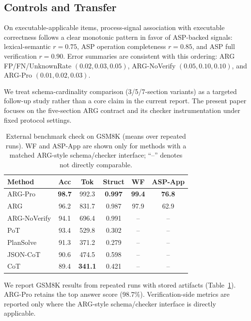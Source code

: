 \documentclass{article}
\begin{document}
\subsection{Controls and Transfer}
On executable-applicable items, process-signal association with executable correctness follows a clear monotonic pattern in favor of ASP-backed signals: lexical-semantic \(r=0.75\), ASP operation completeness \(r=0.85\), and ASP full verification \(r=0.90\). Error summaries are consistent with this ordering: ARG FP/FN/UnknownRate \((0.02,0.03,0.05)\), ARG-NoVerify \((0.05,0.10,0.10)\), and ARG-Pro \((0.01,0.02,0.03)\).

We treat schema-cardinality comparison (3/5/7-section variants) as a targeted follow-up study rather than a core claim in the current report. The present paper focuses on the five-section ARG contract and its checker instrumentation under fixed protocol settings.

\begin{table}[t]
\centering
\scriptsize
\caption{External benchmark check on GSM8K (means over repeated runs). WF and ASP-App are shown only for methods with a matched ARG-style schema/checker interface; ``--'' denotes not directly comparable.}
\label{tab:gsm8k}
\setlength{\tabcolsep}{3.5pt}
\begin{tabular}{lccccc}
\toprule
\rowcolor{headband}
Method & Acc & Tok & Struct & WF & ASP-App \\
\midrule
\rowcolor{ourband}
ARG-Pro & \textbf{98.7} & 992.3 & \textbf{0.997} & \textbf{99.4} & \textbf{76.8} \\
\rowcolor{ourband}
ARG & 96.2 & 831.7 & 0.987 & 97.9 & 62.9 \\
\rowcolor{ourband}
ARG-NoVerify & 94.1 & 696.4 & 0.991 & -- & -- \\
PoT & 93.4 & 529.8 & 0.302 & -- & -- \\
PlanSolve & 91.3 & 371.2 & 0.279 & -- & -- \\
JSON-CoT & 90.6 & 474.5 & 0.598 & -- & -- \\
CoT & 89.4 & \textbf{341.1} & 0.421 & -- & -- \\
\bottomrule
\end{tabular}
\setlength{\tabcolsep}{6pt}
\end{table}

We report GSM8K results from repeated runs with stored artifacts (Table~\ref{tab:gsm8k}). ARG-Pro retains the top answer score (98.7\%). Verification-side metrics are reported only where the ARG-style schema/checker interface is directly applicable.
\end{document}
